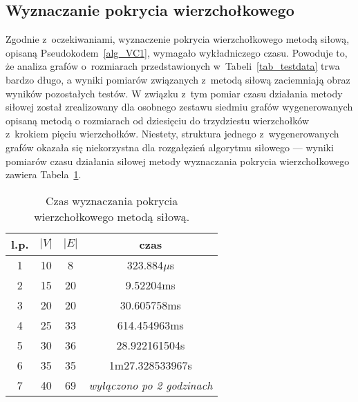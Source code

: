 \subsection{Wyznaczanie pokrycia wierzchołkowego}
\par{
  Zgodnie z~oczekiwaniami, wyznaczenie pokrycia wierzchołkowego metodą siłową, opisaną Pseudokodem~\ref{alg_VC1}, wymagało wykładniczego czasu.
  Powoduje to, że analiza grafów o~rozmiarach przedstawionych w~Tabeli~\ref{tab_testdata} trwa bardzo długo, a wyniki pomiarów związanych z~metodą siłową zaciemniają obraz wyników pozostałych testów.
  W związku z~tym pomiar czasu działania metody siłowej został zrealizowany dla osobnego zestawu siedmiu grafów wygenerowanych opisaną metodą o rozmiarach od dziesięciu do trzydziestu wierzchołków z~krokiem pięciu wierzchołków.
  Niestety, struktura jednego z~wygenerowanych grafów okazała się niekorzystna dla rozgałęzień algorytmu siłowego --- wyniki pomiarów czasu działania siłowej metody wyznaczania pokrycia wierzchołkowego zawiera Tabela~\ref{tab_vc_naive}.
  \begin{table}
    \begin{center}
      \begin{tabular}{| c | c | c | c |}
        \hline
        l.p. & $|V|$ & $|E|$ & czas \\ \hline
        1 & 10 & 8 & 323.884$\mu$s \\
        2 & 15 & 20 & 9.52204ms \\
        3 & 20 & 20 & 30.605758ms \\
        4 & 25 & 33 & 614.454963ms \\
        5 & 30 & 36 & 28.922161504s \\
        6 & 35 & 35 & 1m27.328533967s \\
        7 & 40 & 69 & \textit{wyłączono po 2 godzinach} \\ \hline
      \end{tabular} 
    \end{center}
    \caption{Czas wyznaczania pokrycia wierzchołkowego metodą siłową.}
    \label{tab_vc_naive}
  \end{table}
}
